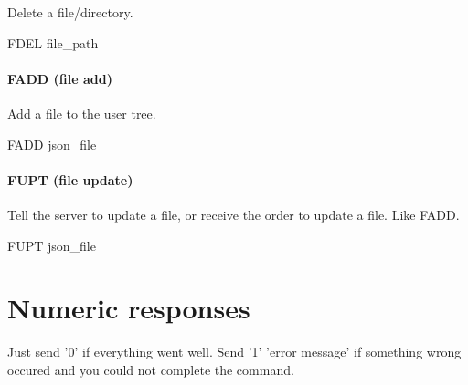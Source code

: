 \documentclass{article}
\begin{document}
Delete a file/directory.\\

\begin{center}FDEL file\_path\end{center}

\paragraph{FADD (file add)}

Add a file to the user tree.

\begin{center}FADD json\_file\end{center}

\paragraph{FUPT (file update)}

Tell the server to update a file, or receive the order to update a file. Like FADD.

\begin{center}FUPT json\_file\end{center}

\section{Numeric responses}

Just send '0' if everything went well. Send '1' 'error message' if something wrong occured and you could not complete the command.
\end{document}
